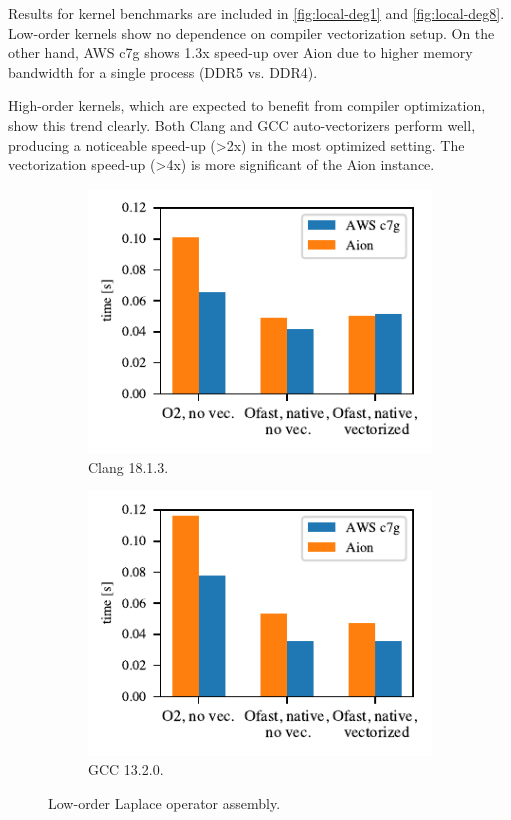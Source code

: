 Results for kernel benchmarks are included in \autoref{fig:local-deg1} and
\autoref{fig:local-deg8}. Low-order kernels show no dependence on compiler
vectorization setup. On the other hand, AWS c7g shows 1.3x speed-up over
Aion due to higher memory bandwidth for a single process (DDR5 vs. DDR4).

High-order kernels, which are expected to benefit from compiler optimization,
show this trend clearly. Both Clang and GCC auto-vectorizers perform well,
producing a noticeable speed-up (\textgreater 2x) in the most optimized setting. The
vectorization speed-up (\textgreater 4x) is more significant of the Aion instance.

\begin{figure}
    \begin{subfigure}{.5\textwidth}
        \centering
        \includegraphics{chapters/chp1/graphics/kernel_plots/local_operator_clang_deg1.pdf}
        \caption{Clang 18.1.3.}
        \label{fig:local-clang-deg1}
    \end{subfigure}%
    \begin{subfigure}{.5\textwidth}
        \centering
        \includegraphics{chapters/chp1/graphics/kernel_plots/local_operator_gcc_deg1.pdf}
        \caption{GCC 13.2.0.}
        \label{fig:local-gcc-deg1}
    \end{subfigure}
    \caption{Low-order Laplace operator assembly.}
    \label{fig:local-deg1}
\end{figure}

